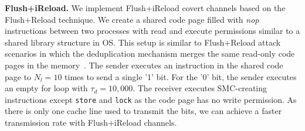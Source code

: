 \begin{table}[h]
\small
\centering
\caption{SMC-based covert channels on instruction cache based on Flush+Reload and Prime+Probe attacks. The covert channels are created on the Intel Cascade Lake architecture. App. means applicability of the attack.}
\setlength{\tabcolsep}{5pt}
\label{tab:covert}
\end{table}

\noindent\textbf{Flush+iReload.} We implement Flush+iReload covert channels based on the Flush+Reload technique. We create a shared code page filled with \textit{nop} instructions between two processes with read and execute permissions similar to a shared library structure in OS. This setup is similar to Flush+Reload attack scenarios in which the deduplication mechanism merges the same read-only code pages in the memory~\cite{irazoqui2014wait}. The sender executes an instruction in the shared code page to $N_l = 10$ times to send a single '1' bit. For the '0' bit, the sender executes an empty for loop with $\tau_d = 10,000$. The receiver executes SMC-creating instructions except \texttt{store} and \texttt{lock} as the code page has no write permission. 
As there is only one cache line used to transmit the bits, we can achieve a faster transmission rate with Flush+iReload channels.

